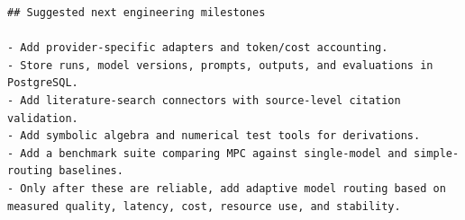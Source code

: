 \documentclass[10pt,a4paper]{article}
\begin{document}
\begin{lstlisting}
## Suggested next engineering milestones

- Add provider-specific adapters and token/cost accounting.
- Store runs, model versions, prompts, outputs, and evaluations in PostgreSQL.
- Add literature-search connectors with source-level citation validation.
- Add symbolic algebra and numerical test tools for derivations.
- Add a benchmark suite comparing MPC against single-model and simple-routing baselines.
- Only after these are reliable, add adaptive model routing based on measured quality, latency, cost, resource use, and stability.
\end{lstlisting}
\end{document}
